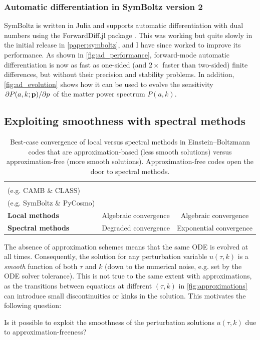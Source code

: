 \documentclass[USenglish, thumbmarks]{uiophdthesis} %
\newcommand\EB{Einstein--Boltzmann}
\begin{document}
\subsubsection{Automatic differentiation in SymBoltz version 2}
\label{sec:differentiability}

SymBoltz is written in Julia and supports automatic differentiation with dual numbers using the ForwardDiff.jl package \cite{revelsForwardModeAutomaticDifferentiation2016}.
This was working but quite slowly in the initial release in \cref{paper:symboltz},
and I have since worked to improve its performance.
As shown in \cref{fig:ad_performance},
forward-mode automatic differentiation is now as fast as one-sided (and $2\times$ faster than two-sided) finite differences,
but without their precision and stability problems.
In addition, \cref{fig:ad_evolution} shows how it can be used to evolve the sensitivity $\pdv{P(a,k;\mathbf{p})}/{p}$ of the matter power spectrum $P(a, k)$.

\subsection{Exploiting smoothness with spectral methods}
\label{sec:spectral}

\begin{table}[t]
\caption[Local versus spectral methods in approximation-based versus approximation-free \EB{} codes]{\label{tab:spectral}
Best-case convergence of local versus spectral methods in \EB{} codes that are approximation-based (less smooth solutions) versus approximation-free (more smooth solutions).
Approximation-free codes open the door to spectral methods.}
\centering
\def\arraystretch{1.5}
\begin{tabular}{lcc}
\toprule
& \makecell{\textbf{Approximation-based} \\ (e.g. CAMB \& CLASS)} & \makecell{\textbf{Approximation-free} \\ (e.g. SymBoltz \& PyCosmo)} \\
\midrule
\textbf{Local methods}    & Algebraic convergence                   & Algebraic convergence                   \\
\textbf{Spectral methods} & Degraded convergence                    & Exponential convergence                  \\
\bottomrule
\end{tabular}
\end{table}

The absence of approximation schemes means that the same ODE is evolved at all times.
Consequently, the solution for any perturbation variable $u(\tau, k)$ is a \emph{smooth} function of both $\tau$ and $k$
(down to the numerical noise, e.g. set by the ODE solver tolerance).
This is not true to the same extent with approximations,
as the transitions between equations at different $(\tau,k)$ in \cref{fig:approximations}
can introduce small discontinuities or kinks in the solution.
This motivates the following question:
\begin{displayquote}
Is it possible to exploit the smoothness of the perturbation solutions $u(\tau, k)$ due to approximation-freeness?
\end{displayquote}
\end{document}
